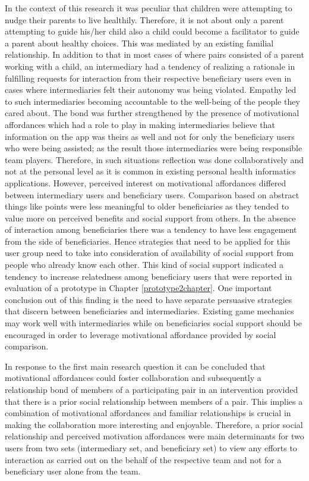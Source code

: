 In the context of this research it was peculiar that children were attempting to nudge their parents to live healthily. Therefore, it is not about only a parent attempting to guide his/her child also a child could become a facilitator to guide a parent about healthy choices. This was mediated by an existing familial relationship. In addition to that in most cases of where pairs consisted of a parent working with a child, an intermediary had a tendency of realizing a rationale in fulfilling  requests for interaction from their respective beneficiary users even in cases where intermediaries felt their autonomy was being violated. Empathy led to such intermediaries becoming accountable to the well-being of the people they cared about. The bond was further strengthened by the presence of motivational affordances which had a role to play in making intermediaries believe that information on the app was theirs as well and not for only the beneficiary users who were being assisted; as the result those intermediaries were being responsible team players. Therefore, in such situations reflection was done collaboratively and not at the personal level as it is common in existing personal health informatics applications.  However, perceived interest on motivational affordances differed between intermediary users and beneficiary users. Comparison based on abstract things like points were less meaningful to older beneficiaries as they tended to value more on perceived benefits and social support from others. In the absence of interaction among beneficiaries there was a tendency to have less engagement from the side of beneficiaries. Hence strategies that need to be applied for this user group need to take into consideration of availability of social support from people who already know each other. This kind of social support indicated a tendency to increase relatedness among beneficiary users that were reported in evaluation of a prototype in Chapter \ref{prototype2chapter}. One important conclusion out of this finding is the need to have separate persuasive strategies that discern between beneficiaries and intermediaries. Existing game mechanics may work well with intermediaries while on beneficiaries social support should be encouraged in order to leverage motivational affordance provided by social comparison.

In response to the first main research question it can be concluded that motivational affordances could foster collaboration and subsequently a relationship bond of members of a participating pair in an intervention provided that there is a prior social relationship between members of a pair. This implies a combination of motivational affordances and familiar relationships is crucial in making the collaboration more interesting and enjoyable. Therefore, a prior social relationship and perceived motivation affordances were main determinants for two users from two sets (intermediary set, and beneficiary set) to view any efforts to interaction as carried out on the behalf of the respective team and not for a beneficiary user alone from the team.  


